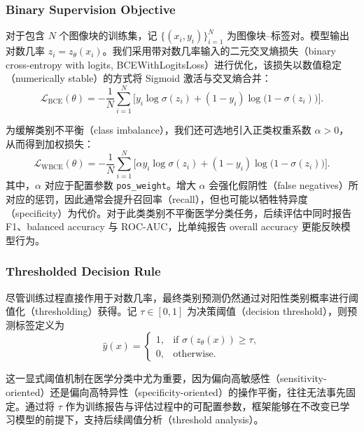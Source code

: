 \subsubsection{Binary Supervision Objective}

对于包含 $N$ 个图像块的训练集，记 $\{(x_{i}, y_{i})\}_{i=1}^{N}$ 为图像块--标签对。模型输出对数几率 $z_{i} = z_{\theta}(x_{i})$。我们采用带对数几率输入的二元交叉熵损失（binary cross-entropy with logits, BCEWithLogitsLoss）进行优化，该损失以数值稳定（numerically stable）的方式将 Sigmoid 激活与交叉熵合并：
\begin{equation}
    \mathcal{L}_{\mathrm{BCE}}(\theta)
    =
    - \frac{1}{N}
    \sum_{i=1}^{N}
    \Big[
        y_{i} \log \sigma(z_{i}) + (1-y_{i}) \log \big(1-\sigma(z_{i})\big)
        \Big].
\end{equation}

为缓解类别不平衡（class imbalance），我们还可选地引入正类权重系数 $\alpha > 0$，从而得到加权损失：
\begin{equation}
    \mathcal{L}_{\mathrm{WBCE}}(\theta)
    =
    - \frac{1}{N}
    \sum_{i=1}^{N}
    \Big[
        \alpha y_{i} \log \sigma(z_{i})
        +
        (1-y_{i}) \log \big(1-\sigma(z_{i})\big)
        \Big].
\end{equation}
其中，$\alpha$ 对应于配置参数 \texttt{pos\_weight}。增大 $\alpha$ 会强化假阴性（false negatives）所对应的惩罚，因此通常会提升召回率（recall），但也可能以牺牲特异度（specificity）为代价。对于此类类别不平衡医学分类任务，后续评估中同时报告 F1、balanced accuracy 与 ROC-AUC，比单纯报告 overall accuracy 更能反映模型行为\cite{Brodersen2010BalancedAccuracy,Fawcett2006ROC}。

\subsubsection{Thresholded Decision Rule}

尽管训练过程直接作用于对数几率，最终类别预测仍然通过对阳性类别概率进行阈值化（thresholding）获得。记 $\tau \in [0,1]$ 为决策阈值（decision threshold），则预测标签定义为
\begin{equation}
    \hat{y}(x) =
    \begin{cases}
        1, & \text{if } \sigma(z_{\theta}(x)) \ge \tau, \\
        0, & \text{otherwise.}
    \end{cases}
\end{equation}

这一显式阈值机制在医学分类中尤为重要，因为偏向高敏感性（sensitivity-oriented）还是偏向高特异性（specificity-oriented）的操作平衡，往往无法事先固定。通过将 $\tau$ 作为训练报告与评估过程中的可配置参数，框架能够在不改变已学习模型的前提下，支持后续阈值分析（threshold analysis）。

